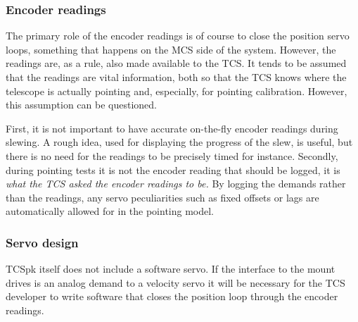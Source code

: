 \documentclass[12pt,fleqn,twoside]{article}
\renewcommand{\_}{{\tt\char'137}}     %
\begin{document}
\subsubsection{Encoder readings}

The primary role of the encoder readings is of course to close the
position servo loops, something that happens on the MCS side of the
system.  However, the readings are, as a rule, also made available
to the TCS.  It tends to be assumed that
the readings are vital information, both so that the TCS
knows where the telescope is actually pointing and, especially, for
pointing calibration.  However, this assumption can be questioned.

First, it is not important to have accurate
on-the-fly encoder readings during
slewing.  A rough idea, used for displaying
the progress of the slew, is useful, but there is no need for
the readings to be precisely timed for instance.  Secondly,
during pointing tests it is not
the encoder reading that should be logged, it is {\it what the TCS
asked the encoder readings to be.}  By logging the demands rather
than the readings, any servo peculiarities such as fixed offsets
or lags are automatically allowed for in the pointing model.

\subsubsection{Servo design}

TCSpk itself does not include a software servo.  If the interface
to the mount drives is an analog demand to a
velocity servo it will be necessary for the TCS developer
to write software that closes the position loop through the encoder
readings.
\end{document}
